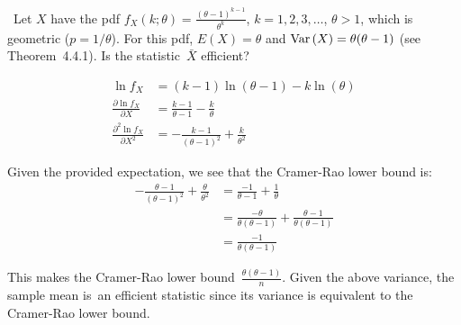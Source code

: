 \begin{problem}
  ~Let $X$ have the pdf ${f_{X}(k;\theta) = \frac{(\theta - 1)^{k-1}}{\theta^{k}}}$, ${k=1,2,3,\ldots}$, ${\theta > 1}$, which is geometric (${p = 1 / \theta}$). For this pdf, ${E(X) = \theta}$ and ${\text{Var}\left(X\right) = \theta (\theta - 1)}$ (see Theorem~4.4.1).  Is the statistic~$\bar{X}$ efficient?
\end{problem}

\begin{align}
  \ln f_X &= (k-1)\ln(\theta - 1) - k \ln(\theta) \\
  \frac{\partial \ln f_X}{\partial X} &= \frac{k-1}{\theta - 1} - \frac{k}{\theta} \\
  \frac{\partial^2 \ln f_X}{\partial X^2} &= -\frac{k-1}{\left(\theta - 1\right)^2} + \frac{k}{\theta^{2}}
\end{align}

Given the provided expectation, we see that the Cramer-Rao lower bound is:
\begin{align}
  -\frac{\theta-1}{\left(\theta - 1\right)^2} + \frac{\theta}{\theta^{2}} &= \frac{-1}{\theta - 1} + \frac{1}{\theta} \\
                                                                          &= \frac{-\theta}{\theta(\theta - 1)} + \frac{\theta - 1}{\theta(\theta - 1)} \\
                                                                          &= \frac{-1}{\theta(\theta - 1)}
\end{align}

This makes the Cramer-Rao lower bound~$\boxed{\frac{\theta(\theta - 1)}{n}}$.  Given the above variance, the sample mean is~an efficient statistic since its variance is equivalent to the Cramer-Rao lower bound.
